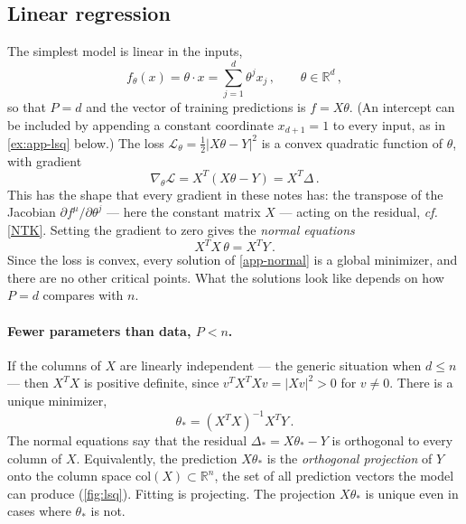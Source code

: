 \documentclass[11pt]{article}
\newcommand{\R}{\mathbb{R}}
\newcommand{\CL}{{\mathcal L}}
\newcommand{\pd}{\partial}
\begin{document}
\subsection{Linear regression}
\label{app:linreg}

The simplest model is linear in the inputs,
%
\begin{equation}
    f_\theta(x) = \theta\cdot x = \sum_{j=1}^d \theta^j x_j\,,\qquad \theta\in \R^d\,, \label{app-linmodel}
\end{equation}
%
so that $P=d$ and the vector of training predictions is $f = X\theta$. (An intercept can be included by appending a constant coordinate $x_{d+1}=1$ to every input, as in \cref{ex:app-lsq} below.) The loss $\CL_\theta = \frac{1}{2}|X\theta - Y|^2$ is a convex quadratic function of $\theta$, with gradient
%
\begin{equation}
    \nabla_\theta \CL = X^T(X\theta - Y) = X^T\Delta\,. \label{app-lsq-grad}
\end{equation}
%
This has the shape that every gradient in these notes has: the transpose of the Jacobian $\pd f^\mu/\pd\theta^j$ --- here the constant matrix $X$ --- acting on the residual, \emph{cf.} \eqref{NTK}. Setting the gradient to zero gives the \emph{normal equations}
%
\begin{equation}
    X^TX\,\theta = X^TY\,. \label{app-normal}
\end{equation}
%
Since the loss is convex, every solution of \eqref{app-normal} is a global minimizer, and there are no other critical points. What the solutions look like depends on how $P=d$ compares with $n$.

\paragraph{Fewer parameters than data, $P<n$.} If the columns of $X$ are linearly independent --- the generic situation when $d\leq n$ --- then $X^TX$ is positive definite, since $v^TX^TXv = |Xv|^2>0$ for $v\neq 0$. There is a unique minimizer,
%
\begin{equation}
    \theta_* = (X^TX)^{-1}X^TY\,. \label{app-lsq}
\end{equation}
%
The normal equations say that the residual $\Delta_* = X\theta_*-Y$ is orthogonal to every column of $X$. Equivalently, the prediction $X\theta_*$ is the \emph{orthogonal projection} of $Y$ onto the column space $\mathrm{col}(X)\subset\R^n$, the set of all prediction vectors the model can produce (\cref{fig:lsq}). Fitting is projecting. The projection $X\theta_*$ is unique even in cases where $\theta_*$ is not.
\end{document}
